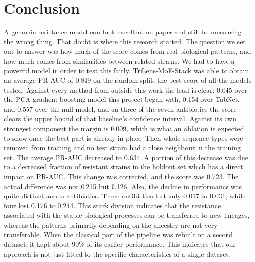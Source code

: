 \chapter{Conclusion}
\label{ch:conclusion}

A genomic resistance model can look excellent on paper and still be measuring the
wrong thing. That doubt is where this research started. The question we set out to
answer was how much of the score comes from real biological patterns, and how much
comes from similarities between related strains. We had to have a powerful model in
order to test this fairly. TriLens-MoE-Stack was able to obtain an average PR-AUC of 0.849 on the random
split, the best score of all the models tested. Against every method from
outside this work the lead is clear: 0.045 over the PCA gradient-boosting model this
project began with, 0.154 over TabNet, and 0.557 over the null model, and on three of the seven
antibiotics the score clears the upper bound of that baseline's confidence interval.
Against its own strongest component the margin is 0.009, which is what an ablation is
expected to show once the best part is already in place. Then whole sequence types were removed from
training and no test strain had a close neighbour in the training set. The average
PR-AUC decreased to 0.634. A portion of this decrease was due to a decreased fraction
of resistant strains in the holdout set which has a direct impact on PR-AUC. This
change was corrected, and the score was 0.723. The actual difference was not 0.215
but 0.126. Also, the decline in performance was quite distinct across antibiotics.
Three antibiotics lost only 0.017 to 0.031, while four lost 0.176 to 0.244. This
stark division indicates that the resistance associated with the stable biological
processes can be transferred to new lineages, whereas the patterns primarily
depending on the ancestry are not very transferable. When the classical part of the
pipeline was rebuilt on a second dataset, it kept about 90\% of its earlier
performance. This indicates that our approach is not just fitted to the specific
characteristics of a single dataset.

